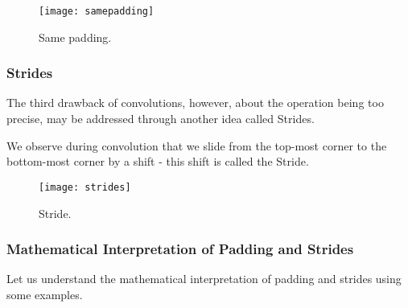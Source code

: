 	\begin{figure}[htb]
		\centering
		\texttt{[image: samepadding]}
		\caption[Same padding]{Same padding.}
		\label{fig:samepadding}
	\end{figure}


	\subsubsection{Strides}

	\begin{bulletedlist}
		\item The third drawback of convolutions, however, about the operation being too precise, may be addressed through another idea called Strides.
		\item We observe during convolution that we slide from the top-most corner to the bottom-most corner by a shift - this shift is called the Stride.
	\end{bulletedlist}

	\begin{figure}[htb]
		\centering
		\texttt{[image: strides]}
		\caption[Stride]{Stride.}
		\label{fig:strides}
	\end{figure}


	\subsubsection{Mathematical Interpretation of Padding and Strides}

Let us understand the mathematical interpretation of padding and strides using some examples.

